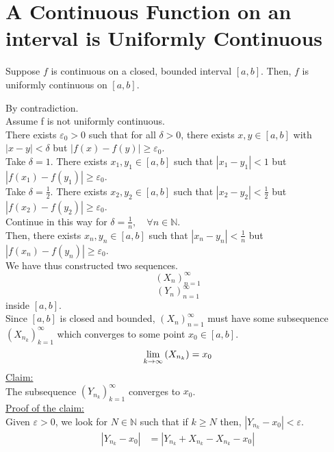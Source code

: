 \documentclass[12pt]{article}
\begin{document}
\section{A Continuous Function on an interval is Uniformly Continuous}
\begin{theo}{}
Suppose \(f\) is continuous on a closed, bounded interval \([a, b]\). Then, \(f\) is uniformly continuous on \([a, b]\).    
\end{theo}
\begin{prf}{}
By contradiction.\\
Assume f is not uniformly continuous.\\ There exists \(\varepsilon_0 > 0\) such that for all \(\delta > 0\), there exists \(x,y \in [a, b]\) with \(|x - y| < \delta\) but \(|f(x) - f(y)| \ge \varepsilon_0\).\\
Take \(\delta = 1\). There exists \(x_1, y_1 \in [a, b]\) such that \(|x_1 - y_1| < 1\) but \(|f(x_1) - f(y_1)| \ge \varepsilon_0\).\\
Take \(\delta = \frac{1}{2}\). There exists \(x_2, y_2 \in [a, b]\) such that \(|x_2 - y_2| < \frac{1}{2}\) but \(|f(x_2) - f(y_2)| \ge \varepsilon_0\).\\
Continue in this way for \(\delta = \frac{1}{n}, \quad \forall n \in \mathbb N\).\\
Then, there exists \(x_n, y_n \in [a, b]\) such that \(|x_n - y_n| < \frac{1}{n}\) but \(|f(x_n) - f(y_n)|\ge \varepsilon_0\).\\
We have thus constructed two sequences.\\
\[\left(X_n\right)_{n=1}^\infty\]
\[\left(Y_n\right)_{n=1}^\infty\]
inside \([a, b]\).\\
Since \([a, b]\) is closed and bounded, \(\left(X_n\right)_{n=1}^\infty\) must have some subsequence \(\left(X_{n_k}\right)_{k=1}^\infty\) which converges to some point \(x_0 \in [a, b]\).
\[\displaystyle\lim_{k\to\infty}\left(X_{n_k}\right) = x_0\]
\underline{Claim:}\\
The subsequence \(\left(Y_{n_k}\right)_{k=1}^\infty\) converges to \(x_0\).\\
\underline{Proof of the claim:}\\
Given \(\varepsilon > 0\), we look for \(N \in \mathbb N\) such that if \(k \ge N\) then, \(|Y_{n_k} - x_0| < \varepsilon\).\\
\begin{align*}
    |Y_{n_k} - x_0| &= |Y_{n_k} + X_{n_k} - X_{n_k} - x_0|\\

\end{align*}
\end{prf}
\end{document}
